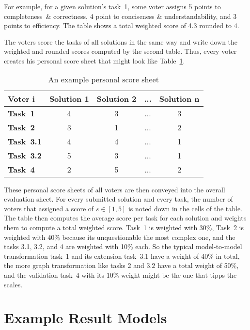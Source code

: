 \documentclass[submission,copyright,creativecommons]{eptcs}
\begin{document}
For example, for a given solution's task~1, some voter assigns 5 points to
completeness~\& correctness, 4 point to conciseness \& understandability, and 3
points to efficiency.  The table shows a total weighted score of 4.3 rounded to
4.

The voters score the tasks of all solutions in the same way and write down the
weighted and rounded scores computed by the second table.  Thus, every voter
creates his personal score sheet that might look like
Table~\ref{tab:personal-score-sheet}.

\begin{table}[h!]
  \centering
  \begin{tabular}[h!]{| l | c | c | c | c |}
    \hline
    \textbf{Voter i}& \textbf{Solution 1} & \textbf{Solution 2} & ... & \textbf{Solution n}\\
    \hline
    \textbf{Task~1} & 4 & 3 & ... & 3\\
    \textbf{Task~2} & 3 & 1 & ... & 2\\
    \textbf{Task~3.1} & 4 & 4 & ... & 1\\
    \textbf{Task~3.2} & 5 & 3 & ... & 1\\
    \textbf{Task~4} & 2 & 5 & ... & 2\\
    \hline
  \end{tabular}
  \caption{An example personal score sheet}
  \label{tab:personal-score-sheet}
\end{table}

These personal score sheets of all voters are then conveyed into the overall
evaluation sheet.  For every submitted solution and every task, the number of
voters that assigned a score of $s \in [1, 5]$ is noted down in the cells of
the table.  The table then computes the average score per task for each
solution and weights them to compute a total weighted score.  Task~1 is
weighted with 30\%, Task~2 is weighted with 40\% because its unquestionable the
most complex one, and the tasks 3.1, 3.2, and 4 are weighted with 10\% each.
So the typical model-to-model transformation task~1 and its extension task~3.1
have a weight of 40\% in total, the more graph transformation like tasks 2 and
3.2 have a total weight of 50\%, and the validation task~4 with its 10\% weight
might be the one that tipps the scales.








\newpage
\appendix
\section{Example Result Models}
\label{sec:result-models}
\end{document}
